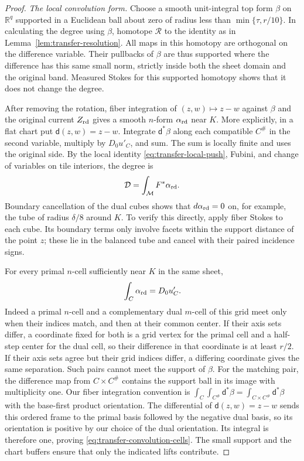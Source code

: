 \begin{proof}
\medskip\noindent\emph{The local convolution form.}
Choose a smooth unit-integral top form \(\beta\) on \(\mathbb R^q\)
supported in a Euclidean ball about zero of radius less than
\(\min\{\tau,r/10\}\).  In calculating the degree using \(\beta\),
homotope \(\mathcal R\) to the identity as in
Lemma~\ref{lem:transfer-resolution}.  All maps in this homotopy are
orthogonal on the difference variable.  Their pullbacks of \(\beta\)
are thus supported where the difference has this same small norm,
strictly inside both the sheet domain and the original band.  Measured
Stokes for this supported homotopy shows that it does not change the
degree.

After removing the rotation, fiber integration of
\((z,w)\mapsto z-w\) against \(\beta\) and the original current
\(Z_{\rm rd}\) gives a smooth \(n\)-form \(\alpha_{\rm rd}\) near \(K\).
More explicitly, in a flat chart put \(\mathsf d(z,w)=z-w\).  Integrate
\(\mathsf d^*\beta\) along each compatible \(C^\#\) in the second
variable, multiply by \(D_0u'_C\), and sum.  The sum is locally finite
and uses the original side.  By the local identity
\eqref{eq:transfer-local-push}, Fubini, and change of variables on tile
interiors, the degree is
\begin{equation}\label{eq:transfer-convolution-degree}
                       \mathcal D=\int_{\mathcal M}F^*\alpha_{\rm rd}.
\end{equation}
Boundary cancellation of the dual cubes shows that
\(d\alpha_{\rm rd}=0\) on, for example, the tube of radius
\(\delta/8\) around \(K\).  To verify this directly, apply fiber
Stokes to each cube.  Its boundary terms only involve facets within
the support distance of the point \(z\); these lie in the balanced
tube and cancel with their paired incidence signs.

For every primal \(n\)-cell sufficiently near \(K\) in the same
sheet,
\begin{equation}\label{eq:transfer-convolution-cells}
                         \int_C\alpha_{\rm rd}=D_0u'_C.
\end{equation}
Indeed a primal \(n\)-cell and a complementary dual \(m\)-cell of
this grid meet only when their indices match, and then at their common
center.  If their axis sets differ, a coordinate fixed for both is a
grid vertex for the primal cell and a half-step center for the dual
cell, so their difference in that coordinate is at least \(r/2\).
If their axis sets agree but their grid indices differ, a differing
coordinate gives the same separation.  Such pairs cannot meet the
support of \(\beta\).  For the matching pair, the difference map
from \(C\times C^\#\) contains the support ball in its image with
multiplicity one.  Our fiber integration convention is
\(\int_C\int_{C^\#}\mathsf d^*\beta=
\int_{C\times C^\#}\mathsf d^*\beta\) with the base-first product
orientation.  The differential of \(\mathsf d(z,w)=z-w\) sends this
ordered frame to the primal basis followed by the negative dual basis,
so its orientation is positive by our choice of the dual orientation.
Its integral is therefore
one, proving \eqref{eq:transfer-convolution-cells}.  The small support
and the chart buffers ensure that only the indicated lifts contribute.


\end{proof}
